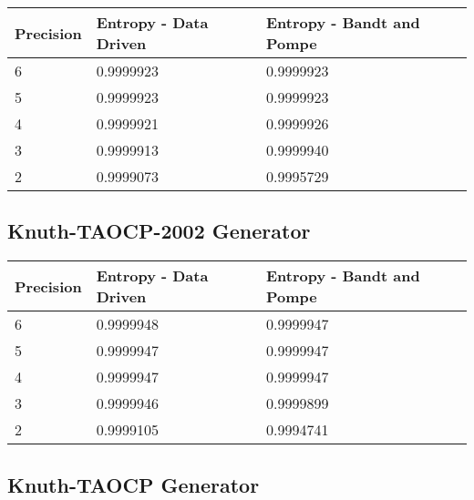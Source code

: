 \documentclass[12pt,letterpaper]{article}
\begin{document}
\begin{table}[H]
\begin{center}
\begin{tabularx}{\textwidth}{|p{2.3cm}|p{6.0cm}|p{6.0cm}|}
\hline                              
\textbf{Precision} & \textbf{Entropy - Data Driven} & \textbf{Entropy - Bandt and Pompe}\\
\hline
6 & 0.9999923 & 0.9999923\\
\hline
5 & 0.9999923 & 0.9999923\\
\hline     
4 & 0.9999921 & 0.9999926\\
\hline     
3 & 0.9999913 & 0.9999940\\
\hline     
2 & 0.9999073 & 0.9995729\\
\hline  
\end{tabularx}
\end{center}
\end{table}

\subsection{Knuth-TAOCP-2002 Generator}

\begin{table}[H]
\begin{center}
\begin{tabularx}{\textwidth}{|p{2.3cm}|p{6.0cm}|p{6.0cm}|}
\hline                              
\textbf{Precision} & \textbf{Entropy - Data Driven} & \textbf{Entropy - Bandt and Pompe}\\
\hline
6 & 0.9999948 & 0.9999947\\
\hline
5 & 0.9999947 & 0.9999947\\
\hline     
4 & 0.9999947 & 0.9999947\\
\hline     
3 & 0.9999946 & 0.9999899\\
\hline     
2 & 0.9999105 & 0.9994741\\
\hline  
\end{tabularx}
\end{center}
\end{table}

\subsection{Knuth-TAOCP Generator}
\end{document}
